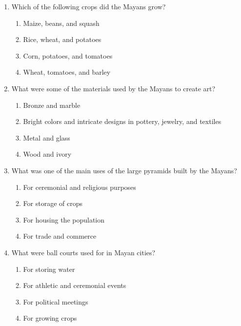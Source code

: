 \documentclass[12pt]{article}
\begin{document}
\begin{enumerate}
\vspace{0.5cm}

\item Which of the following crops did the Mayans grow?
\begin{enumerate}[label=\Alph*.]
    \item Maize, beans, and squash
    \item Rice, wheat, and potatoes
    \item Corn, potatoes, and tomatoes
    \item Wheat, tomatoes, and barley
\end{enumerate}

\vspace{0.5cm}

\item What were some of the materials used by the Mayans to create art?
\begin{enumerate}[label=\Alph*.]
    \item Bronze and marble
    \item Bright colors and intricate designs in pottery, jewelry, and textiles
    \item Metal and glass
    \item Wood and ivory
\end{enumerate}

\vspace{0.5cm}

\item What was one of the main uses of the large pyramids built by the Mayans?
\begin{enumerate}[label=\Alph*.]
    \item For ceremonial and religious purposes
    \item For storage of crops
    \item For housing the population
    \item For trade and commerce
\end{enumerate}

\vspace{0.5cm}

\item What were ball courts used for in Mayan cities?
\begin{enumerate}[label=\Alph*.]
    \item For storing water
    \item For athletic and ceremonial events
    \item For political meetings
    \item For growing crops
\end{enumerate}


\end{enumerate}
\end{document}
